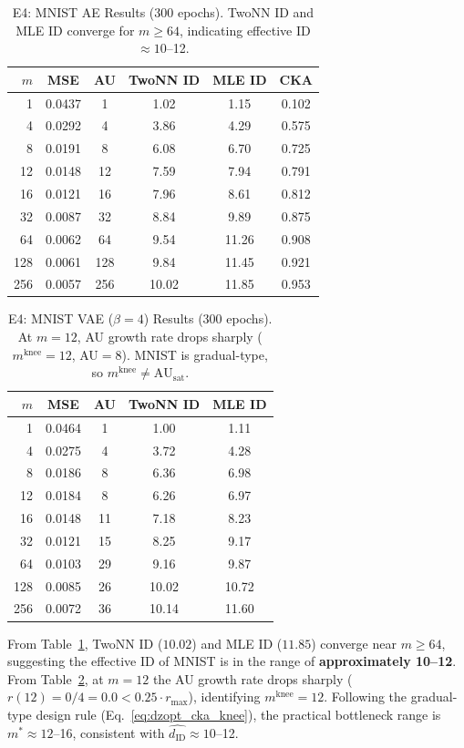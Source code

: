 \documentclass[lettersize,journal]{IEEEtran}
\newcommand{\dID}{d_{\mathrm{ID}}}
\newcommand{\AUsat}{\mathrm{AU}_{\mathrm{sat}}}
\begin{document}
\begin{table}[!t]
\centering
\caption{E4: MNIST AE Results (300 epochs). TwoNN ID and MLE ID converge for $m \geq 64$, indicating effective ID $\approx 10$--12.}
\label{tab:e4_ae}
\begin{tabular}{rccccc}
\toprule
$m$ & MSE & AU & TwoNN ID & MLE ID & CKA \\
\midrule
1   & 0.0437 & 1   & 1.02  & 1.15  & 0.102 \\
4   & 0.0292 & 4   & 3.86  & 4.29  & 0.575 \\
8   & 0.0191 & 8   & 6.08  & 6.70  & 0.725 \\
12  & 0.0148 & 12  & 7.59  & 7.94  & 0.791 \\
16  & 0.0121 & 16  & 7.96  & 8.61  & 0.812 \\
32  & 0.0087 & 32  & 8.84  & 9.89  & 0.875 \\
64  & 0.0062 & 64  & 9.54  & 11.26 & 0.908 \\
128 & 0.0061 & 128 & 9.84  & 11.45 & 0.921 \\
256 & 0.0057 & 256 & 10.02 & 11.85 & 0.953 \\
\bottomrule
\end{tabular}
\end{table}

\begin{table}[!t]
\centering
\caption{E4: MNIST VAE ($\beta=4$) Results (300 epochs). At $m=12$, AU growth rate drops sharply ($m^\mathrm{knee}=12$, AU$=8$). MNIST is gradual-type, so $m^\mathrm{knee} \neq \AUsat$.}
\label{tab:e4_vae}
\begin{tabular}{rcccc}
\toprule
$m$ & MSE & AU & TwoNN ID & MLE ID \\
\midrule
1   & 0.0464 & 1  & 1.00 & 1.11 \\
4   & 0.0275 & 4  & 3.72 & 4.28 \\
8   & 0.0186 & 8  & 6.36 & 6.98 \\
12  & 0.0184 & 8  & 6.26 & 6.97 \\
16  & 0.0148 & 11 & 7.18 & 8.23 \\
32  & 0.0121 & 15 & 8.25 & 9.17 \\
64  & 0.0103 & 29 & 9.16 & 9.87 \\
128 & 0.0085 & 26 & 10.02 & 10.72 \\
256 & 0.0072 & 36 & 10.14 & 11.60 \\
\bottomrule
\end{tabular}
\end{table}

From Table~\ref{tab:e4_ae}, TwoNN ID ($10.02$) and MLE ID ($11.85$) converge near $m \geq 64$, suggesting the effective ID of MNIST is in the range of \textbf{approximately 10--12}.
From Table~\ref{tab:e4_vae}, at $m=12$ the AU growth rate drops sharply ($r(12) = 0/4 = 0.0 < 0.25 \cdot r_\mathrm{max}$), identifying $m^\mathrm{knee} = 12$.
Following the gradual-type design rule (Eq.~\eqref{eq:dzopt_cka_knee}), the practical bottleneck range is $m^* \approx 12$--16, consistent with $\hat{\dID} \approx 10$--12.
\end{document}
